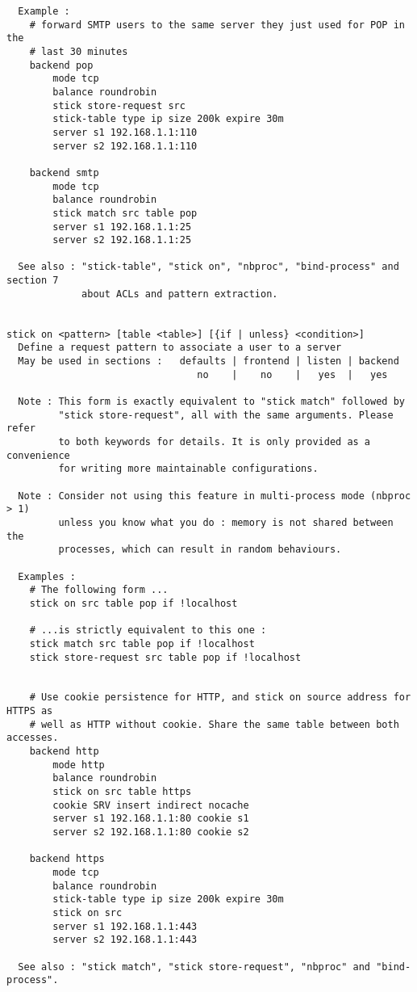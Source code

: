 \begin{verbatim}
  Example :
    # forward SMTP users to the same server they just used for POP in the
    # last 30 minutes
    backend pop
        mode tcp
        balance roundrobin
        stick store-request src
        stick-table type ip size 200k expire 30m
        server s1 192.168.1.1:110
        server s2 192.168.1.1:110

    backend smtp
        mode tcp
        balance roundrobin
        stick match src table pop
        server s1 192.168.1.1:25
        server s2 192.168.1.1:25

  See also : "stick-table", "stick on", "nbproc", "bind-process" and section 7
             about ACLs and pattern extraction.


stick on <pattern> [table <table>] [{if | unless} <condition>]
  Define a request pattern to associate a user to a server
  May be used in sections :   defaults | frontend | listen | backend
                                 no    |    no    |   yes  |   yes

  Note : This form is exactly equivalent to "stick match" followed by
         "stick store-request", all with the same arguments. Please refer
         to both keywords for details. It is only provided as a convenience
         for writing more maintainable configurations.

  Note : Consider not using this feature in multi-process mode (nbproc > 1)
         unless you know what you do : memory is not shared between the
         processes, which can result in random behaviours.

  Examples :
    # The following form ...
    stick on src table pop if !localhost

    # ...is strictly equivalent to this one :
    stick match src table pop if !localhost
    stick store-request src table pop if !localhost


    # Use cookie persistence for HTTP, and stick on source address for HTTPS as
    # well as HTTP without cookie. Share the same table between both accesses.
    backend http
        mode http
        balance roundrobin
        stick on src table https
        cookie SRV insert indirect nocache
        server s1 192.168.1.1:80 cookie s1
        server s2 192.168.1.1:80 cookie s2

    backend https
        mode tcp
        balance roundrobin
        stick-table type ip size 200k expire 30m
        stick on src
        server s1 192.168.1.1:443
        server s2 192.168.1.1:443

  See also : "stick match", "stick store-request", "nbproc" and "bind-process".



\end{verbatim}
